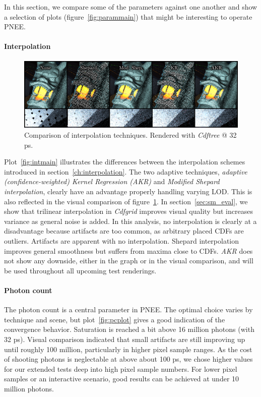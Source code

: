 In this section, we compare some of the parameters against one another and show a selection of plots (figure~\ref{fig:parammain}) that might be interesting to operate PNEE.

\paragraph{Interpolation}

\begin{figure}
    \centering
    \includegraphics[width=1\textwidth]{figures/comparisons/int_comp.pdf}
    \caption{Comparison of interpolation techniques. Rendered with \textit{Cdftree} @ 32 ps.}
    \label{fig:intcomp}
\end{figure}

Plot~\ref{fig:intmain} illustrates the differences between the interpolation schemes introduced in section~\ref{ch:interpolation}. The two adaptive techniques, \textit{adaptive (confidence-weighted) Kernel Regression (AKR)} and \textit{Modified Shepard interpolation}, clearly have an advantage properly handling varying LOD. This is also reflected in the visual comparison of figure~\ref{fig:intcomp}. In section~\ref{sec:sm_eval}, we show that trilinear interpolation in \textit{Cdfgrid} improves visual quality but increases variance as general noise is added. In this analysis, no interpolation is clearly at a disadvantage because artifacts are too common, as arbitrary placed CDFs are outliers. Artifacts are apparent with no interpolation. Shepard interpolation improves general smoothness but suffers from maxima close to CDFs. \textit{AKR} does not show any downside, either in the graph or in the visual comparison, and will be used throughout all upcoming test renderings.

\paragraph{Photon count}

The photon count is a central parameter in PNEE. The optimal choice varies by technique and scene, but plot~\ref{fig:pcplot} gives a good indication of the convergence behavior. Saturation is reached a bit above 16 million photons (with 32 ps). Visual comparison indicated that small artifacts are still improving up until roughly 100 million, particularly in higher pixel sample ranges. As the cost of shooting photons is neglectable at above about 100 ps, we chose higher values for our extended tests deep into high pixel sample numbers. For lower pixel samples or an interactive scenario, good results can be achieved at under 10 million photons.

